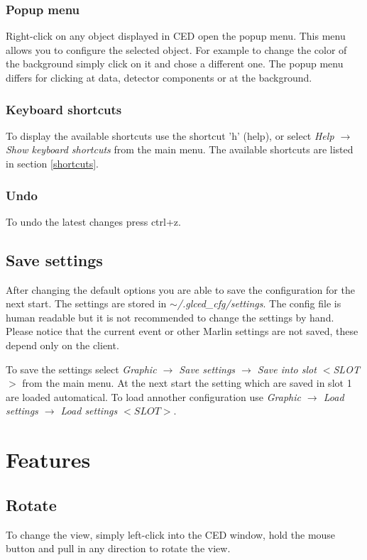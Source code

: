 \documentclass[a4paper,10pt]{article}
\begin{document}
\subsubsection{Popup menu}
Right-click on any object displayed in CED open the popup menu. 
This menu allows you to configure the selected object.
For example to change the color of the background simply click on it and chose a different one.
The popup menu differs for clicking at data, detector components or at the background.

\subsubsection{Keyboard shortcuts}
To display the available shortcuts use the shortcut 'h' (help), or select \textit{Help $\to$ Show keyboard shortcuts} from the main menu.
The available shortcuts are listed in section \ref{shortcuts}.

\subsubsection{Undo}
To undo the latest changes press ctrl+z.

\subsection{Save settings}
After changing the default options you are able to save the configuration for the next start. 
The settings are stored in \textit{$\sim$/.glced\_cfg/settings}.
The config file  is human readable but it is not recommended to change the settings by hand. 
Please notice that the current event or other Marlin settings are not saved, these depend only on the client. 

To save the settings select 
\textit{Graphic $\to$ Save settings $\to$ Save into slot $<$SLOT$>$} from the main menu. 
At the next start the setting which are saved in slot 1 are loaded automatical. 
To load annother configuration use 
\textit{Graphic $\to$ Load settings $\to$ Load settings $<SLOT>$}.


\section{Features}
\subsection{Rotate}
To change the view, simply left-click into the CED window, hold the mouse button and pull in any direction to rotate the view.
\end{document}

